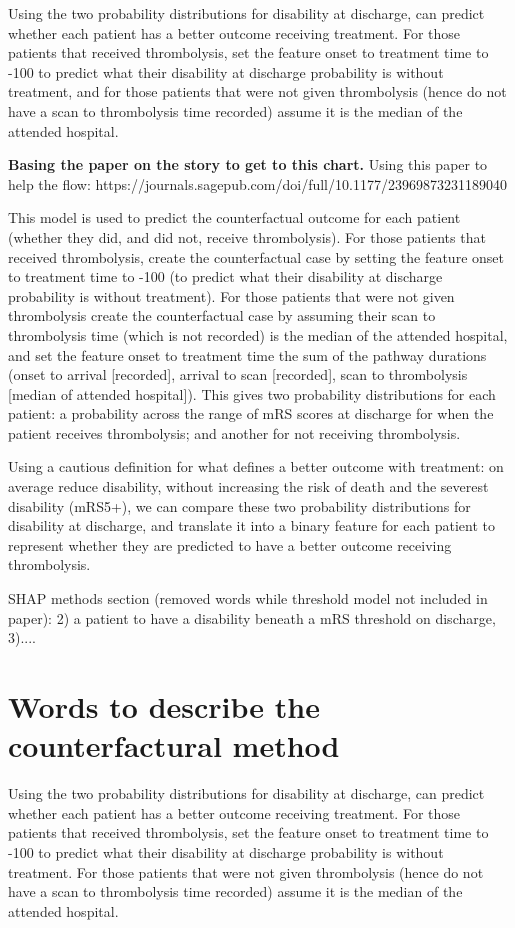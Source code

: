 Using the two probability distributions for disability at discharge, can predict whether each patient has a better outcome receiving treatment. For those patients that received thrombolysis, set the feature onset to treatment time to -100 to predict what their disability at discharge probability is without treatment, and for those patients that were not given thrombolysis (hence do not have a scan to thrombolysis time recorded) assume it is the median of the attended hospital.


\textbf{Basing the paper on the story to get to this chart.}
Using this paper to help the flow: https://journals.sagepub.com/doi/full/10.1177/23969873231189040


This model is used to predict the counterfactual outcome for each patient (whether they did, and did not, receive thrombolysis). For those patients that received thrombolysis, create the counterfactual case by setting the feature onset to treatment time to -100 (to predict what their disability at discharge probability is without treatment). For those patients that were not given thrombolysis create the counterfactual case by assuming their scan to thrombolysis time (which is not recorded) is the median of the attended hospital, and set the feature onset to treatment time the sum of the pathway durations (onset to arrival [recorded], arrival to scan [recorded], scan to thrombolysis [median of attended hospital]). This gives two probability distributions for each patient: a probability across the range of mRS scores at discharge for when the patient receives thrombolysis; and another for not receiving thrombolysis. 

Using a cautious definition for what defines a better outcome with treatment: on average reduce disability, without increasing the risk of death and the severest disability (mRS5+), we can compare these two probability distributions for disability at discharge, and translate it into a binary feature for each patient to represent whether they are predicted to have a better outcome receiving thrombolysis.



SHAP methods section (removed words while threshold model not included in paper):
    2) a patient to have a disability beneath a mRS threshold on discharge, 3)....



\section{Words to describe the counterfactural method}
Using the two probability distributions for disability at discharge, can predict whether each patient has a better outcome receiving treatment. For those patients that received thrombolysis, set the feature onset to treatment time to -100 to predict what their disability at discharge probability is without treatment. For those patients that were not given thrombolysis (hence do not have a scan to thrombolysis time recorded) assume it is the median of the attended hospital.


